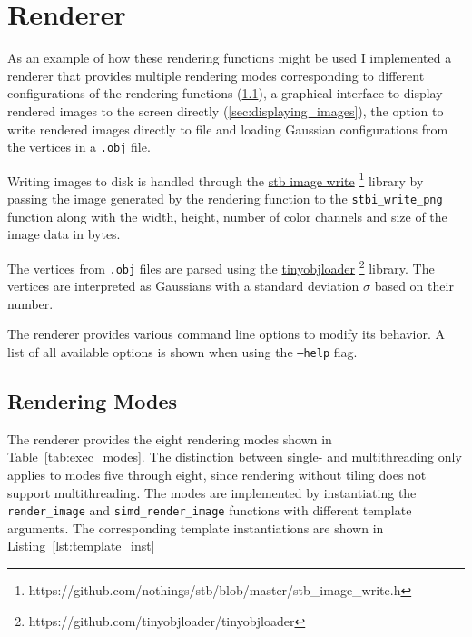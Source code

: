 \documentclass[a4paper, 11pt]{memoir}
\begin{document}
    \section{Renderer}
    \label{sec:renderer}
    As an example of how these rendering functions might be used I implemented a renderer that provides multiple rendering
    modes corresponding to different configurations of the rendering functions (\ref{sec:rendering_modes}), a graphical
    interface to display rendered images to the screen directly (\ref{sec:displaying_images}), the option to write
    rendered images directly to file and loading Gaussian configurations from the vertices in a \texttt{.obj}
    file.

    Writing images to disk is handled through the \href{https://github.com/nothings/stb/blob/master/stb_image_write.h}{stb image write}
    \footnote{https://github.com/nothings/stb/blob/master/stb\_image\_write.h} library by passing the image generated by
    the rendering function to the \texttt{stbi_write_png} function along with the width, height, number of color
    channels and size of the image data in bytes.

    The vertices from \texttt{.obj} files are parsed using the \href{https://github.com/tinyobjloader/tinyobjloader}{tinyobjloader}
    \footnote{https://github.com/tinyobjloader/tinyobjloader} library. The vertices are interpreted as Gaussians with a
    standard deviation $\sigma$ based on their number.

    The renderer provides various command line options to modify its behavior. A list of all available options is shown
    when using the \texttt{--help} flag.

    \subsection{Rendering Modes}
    \label{sec:rendering_modes}
    The renderer provides the eight rendering modes shown in Table~\ref{tab:exec_modes}. The distinction between single-
    and multithreading only applies to modes five through eight, since rendering without tiling does not support
    multithreading.
    The modes are implemented by instantiating the \texttt{render_image} and \texttt{simd_render_image}
    functions with different template arguments. The corresponding template instantiations are shown in Listing~\ref{lst:template_inst}
\end{document}
